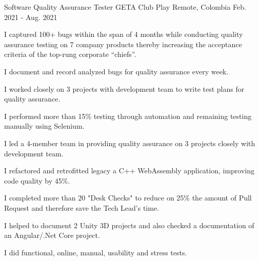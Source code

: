\begin{cventries}
  \cventry
    {Software Quality Assurance Tester} %
    {GETA Club Play} %
    {Remote, Colombia} %
    {Feb. 2021 - Aug. 2021} %
    {
      \begin{cvitems} %
        \item {I captured 100+ bugs within the span of 4 months while conducting quality assurance testing on 7 company products thereby increasing the acceptance criteria of the top-rung corporate “chiefs”.}
        \item {I document and record analyzed bugs for quality assurance every week.}
        \item {I worked closely on 3 projects with development team to write test plans for quality assurance.}
        \item {I performed more than 15\% testing through automation and remaining testing manually using Selenium.}
        \item {I led a 4-member team in providing quality assurance on 3 projects closely with development team.}
        \item {I refactored and retrofitted legacy a C++ WebAssembly application, improving code quality by 45\%.}
        \item {I completed more than 20 "Desk Checks" to reduce on 25\% the amount of Pull Request and therefore save the Tech Lead's time.}
        \item {I helped to document 2 Unity 3D projects and also checked a documentation of an Angular/.Net Core project.}
        \item {I did functional, online, manual, usability and stress tests.}
      \end{cvitems}
    }
\end{cventries}
